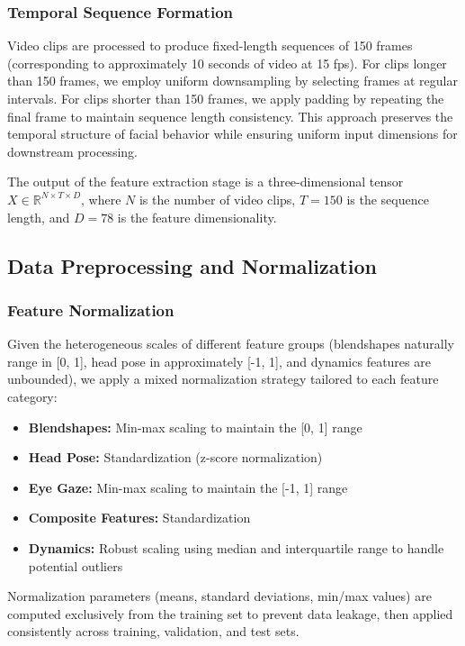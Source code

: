 \documentclass[11pt,a4paper]{article}
\begin{document}
\subsubsection{Temporal Sequence Formation}

Video clips are processed to produce fixed-length sequences of 150 frames (corresponding to approximately 10 seconds of video at 15 fps). For clips longer than 150 frames, we employ uniform downsampling by selecting frames at regular intervals. For clips shorter than 150 frames, we apply padding by repeating the final frame to maintain sequence length consistency. This approach preserves the temporal structure of facial behavior while ensuring uniform input dimensions for downstream processing.

The output of the feature extraction stage is a three-dimensional tensor $X \in \mathbb{R}^{N \times T \times D}$, where $N$ is the number of video clips, $T = 150$ is the sequence length, and $D = 78$ is the feature dimensionality.


\subsection{Data Preprocessing and Normalization}

\subsubsection{Feature Normalization}

Given the heterogeneous scales of different feature groups (blendshapes naturally range in [0, 1], head pose in approximately [-1, 1], and dynamics features are unbounded), we apply a mixed normalization strategy tailored to each feature category:

\begin{itemize}
    \item \textbf{Blendshapes:} Min-max scaling to maintain the [0, 1] range
    \item \textbf{Head Pose:} Standardization (z-score normalization)
    \item \textbf{Eye Gaze:} Min-max scaling to maintain the [-1, 1] range
    \item \textbf{Composite Features:} Standardization
    \item \textbf{Dynamics:} Robust scaling using median and interquartile range to handle potential outliers
\end{itemize}

Normalization parameters (means, standard deviations, min/max values) are computed exclusively from the training set to prevent data leakage, then applied consistently across training, validation, and test sets.
\end{document}
